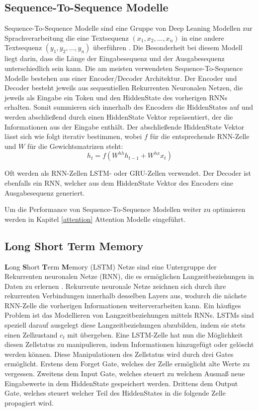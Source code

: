 \subsection{Sequence-To-Sequence Modelle}
Sequence-To-Sequence Modelle sind eine Gruppe von Deep Leaning Modellen zur Sprachverarbeitung die eine Textsequenz $(x_1,x_2,\ldots,x_n)$ in eine andere Textsequenz $(y_1,y_2,\ldots,y_n)$ überführen \citep{DBLP:journals/corr/SutskeverVL14}.
Die Besonderheit bei diesem Modell liegt darin, dass die Länge der Eingabesequenz und der Ausgabesequenz unterschiedlich sein kann.
Die am meisten verwendeten Sequence-To-Sequence Modelle bestehen aus einer Encoder/Decoder Architektur.
Der Encoder und Decoder besteht jeweils aus sequentiellen Rekurrenten Neuronalen Netzen, die jeweils als Eingabe ein Token und den HiddenState des vorherigen RNNs erhalten.
Somit summieren sich innerhalb des Encoders die HiddenStates auf und werden abschließend durch einen HiddenState Vektor repräsentiert, der die Informationen aus der Eingabe enthält.
Der abschließende HiddenState Vektor lässt sich wie folgt iterativ bestimmen, wobei $f$ für die entsprechende RNN-Zelle und $W$ für die Gewichtsmatrizen steht:
\begin{equation}
    h_t = f(W^{hh}h_{t-1}+W^{hx}x_t)
\end{equation}

Oft werden als RNN-Zellen LSTM- oder GRU-Zellen verwendet.
Der Decoder ist ebenfalls ein RNN, welcher aus dem HiddenState Vektor des Encoders eine Ausgabesequenz generiert.

Um die Performance von Sequence-To-Sequence Modellen weiter zu optimieren werden in Kapitel \ref{attention} Attention Modelle eingeführt.


\subsection{\textbf{L}ong \textbf{S}hort \textbf{T}erm \textbf{M}emory}
\textbf{L}ong \textbf{S}hort \textbf{T}erm \textbf{M}emory (LSTM) Netze sind eine Untergruppe der Rekurrenten neuronalen Netze (RNN), die es ermöglichen Langzeitbeziehungen in Daten zu erlernen \citep{lstm}.
Rekurrente neuronale Netze zeichnen sich durch ihre rekurrenten Verbindungen innerhalb desselben Layers aus, wodurch die nächste RNN-Zelle die vorherigen Informationen weiterverarbeiten kann.
Ein häufiges Problem ist das Modellieren von Langzeitbeziehungen mittels RNNs. 
LSTMs sind speziell darauf ausgelegt diese Langzeitbeziehungen abzubilden, indem sie stets einen Zellzustand $c_t$ mit übergeben.
Eine LSTM-Zelle hat nun die Möglichkeit diesen Zellstatus zu manipulieren, indem Informationen hinzugefügt oder gelöscht werden können.
Diese Manipulationen des Zellstatus wird durch drei Gates ermöglicht. 
Erstens dem Forget Gate, welches der Zelle ermöglicht alte Werte zu vergessen.
Zweitens dem Input Gate, welches steuert zu welchem Ausmaß neue Eingabewerte in dem HiddenState gespeichert werden.
Drittens dem Output Gate, welches steuert welcher Teil des HiddenStates in die folgende Zelle propagiert wird.

